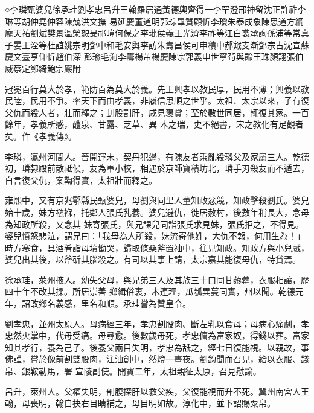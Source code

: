 
\begin{pinyinscope}

 ○李璘甄婆兒徐承珪劉孝忠呂升王翰羅居通黃德輿齊得一李罕澄邢神留沈正許祚李琳等胡仲堯仲容陳兢洪文撫
 易延慶董道明郭琮畢贊顧忻李瓊朱泰成象陳思道方綱龐天祐劉斌樊景溫榮恕旻祁暐何保之李玭侯義王光濟李祚等江白裘承詢孫浦等常真子晏王洤等杜誼姚宗明鄧中和毛安輿李訪朱壽昌侯可申積中郝戭支漸鄧宗古沈宣蘇慶文臺亨仰忻趙伯深
 彭瑜毛洵李籌楊芾楊慶陳宗郭義申世寧茍與齡王珠顏詡張伯威蔡定鄭綺鮑宗巖附



 冠冕百行莫大於孝，範防百為莫大於義。先王興孝以教民厚，民用不薄；興義以教民睦，民用不爭。率天下而由孝義，非履信思順之世乎。太祖、太宗以來，子有復父仇而殺人者，壯而釋之；刲股割肝，咸見褒賞；至於數世同居，輒復其家。一百餘年，孝義所感，醴泉、甘露、芝草、異
 木之瑞，史不絕書，宋之教化有足觀者矣。作《孝義傳》。



 李璘，瀛州河間人。晉開運末，契丹犯邊，有陳友者乘亂殺璘父及家屬三人。乾德初，璘隸殿前散祗候，友為軍小校，相遇於京師寶積坊北，璘手刃殺友而不遁去，自言復父仇，案鞫得實，太祖壯而釋之。



 雍熙中，又有京兆鄠縣民甄婆兒，母劉與同里人董知政忿競，知政擊殺劉氏。婆兒始十歲，妹方襁褓，托鄰人張氏乳養。婆兒避仇，徙居赦村，後數年稍長大，念母為知政所殺，又念其
 妹寄張氏，與兄課兒同詣張氏求見妹，張氏拒之，不得見。婆兒憤怒悲泣，謂兄曰：「我母為人所殺，妹流寄他姓，大仇不報，何用生為！」時方寒食，具酒肴詣母墳慟哭，歸取條桑斧置袖中，往見知政。知政方與小兒戲，婆兒出其後，以斧斫其腦殺之。有司以其事上請，太宗嘉其能復母仇，特貸焉。



 徐承珪，萊州掖人。幼失父母，與兄弟三人及其族三十口同甘藜藿，衣服相讓，歷四十年不改其操。所居崇善
 鄉緝俗裏，木連理，瓜瓠異蔓同實，州以聞。乾德元年，詔改鄉名義感，里名和順。承珪嘗為贊皇令。



 劉孝忠，並州太原人。母病經三年，孝忠割股肉、斷左乳以食母；母病心痛劇，孝忠然火掌中，代母受痛。母尋愈。後數歲母死，孝忠傭為富家奴，得錢以葬。富家知其孝行，養為己子。後養父兩目失明，孝忠為舐之，經七日復能視。以親故，事佛謹，嘗於像前割雙股肉，注油創中，然燈一晝夜。劉鈞聞而召見，給以衣服、錢帛、銀鞍勒馬，署
 宣陵副使。開寶二年，太祖親征太原，召見慰諭。



 呂升，萊州人。父權失明，剖腹探肝以救父疾，父復能視而升不死。冀州南宮人王翰，母喪明，翰自抉右目睛補之，母目明如故。淳化中，並下詔賜粟帛。




\end{pinyinscope}
